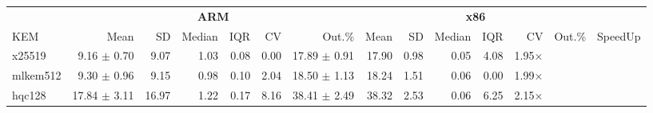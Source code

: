 \begin{table}[!ht]
\centering
\begin{tabular}{l|rrrrrr|rrrrrr|r}
\toprule
& \multicolumn{6}{c}{\bfseries ARM} & \multicolumn{6}{c}{\bfseries x86} & \\
\cmidrule(lr){2-7} \cmidrule(lr){8-13}
KEM 			& Mean & SD & Median & IQR & CV & Out.\% & Mean & SD & Median & IQR & CV & Out.\% & SpeedUp \\
\midrule
x25519 		& 9.16   $\pm$  0.70 & 9.07 & 1.03 & 0.08 & 0.00 & 17.89 $\pm$  0.91 & 17.90 & 0.98 & 0.05 & 4.08 & 1.95× \\
mlkem512 	& 9.30  $\pm$  0.96 & 9.15 & 0.98 & 0.10 & 2.04 & 18.50 $\pm$  1.13 & 18.24 & 1.51 & 0.06 & 0.00 & 1.99× \\
hqc128			& 17.84 $\pm$  3.11 & 16.97 & 1.22 & 0.17 & 8.16 & 38.41 $\pm$  2.49 & 38.32 & 2.53 & 0.06 & 6.25 & 2.15× \\


\bottomrule
\end{tabular}
\end{table}
